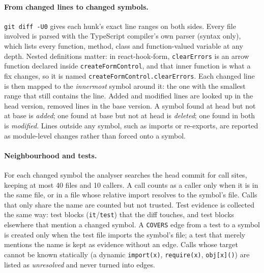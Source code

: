 \paragraph{From changed lines to changed symbols.} \texttt{git diff -U0} gives
each hunk's exact line ranges on both sides. Every file involved is parsed with
the TypeScript compiler's own parser (syntax only), which lists every function,
method, class and function-valued variable at any depth. Nested definitions
matter: in react-hook-form, \texttt{clearErrors} is an arrow function declared
inside \texttt{createFormControl}, and that inner function is what a fix
changes, so it is named \texttt{createFormControl.clearErrors}. Each changed
line is then mapped to the \emph{innermost} symbol around it: the one with the
smallest range that still contains the line. Added and modified lines are
looked up in the head version, removed lines in the base version. A symbol
found at head but not at base is \emph{added}; one found at base but not at
head is \emph{deleted}; one found in both is \emph{modified}. Lines outside any
symbol, such as imports or re-exports, are reported as module-level changes
rather than forced onto a symbol.

\paragraph{Neighbourhood and tests.} For each changed symbol the analyser
searches the head commit for call sites, keeping at most 40 files and 10
callers. A call counts as a caller only when it is in the same file, or in a
file whose relative import resolves to the symbol's file. Calls that only
share the name are counted but not trusted. Test evidence is collected the
same way: test blocks (\texttt{it}/\texttt{test}) that the diff touches, and
test blocks elsewhere that mention a changed symbol. A \texttt{COVERS} edge
from a test to a symbol is created only when the test file imports the
symbol's file; a test that merely mentions the name is kept as evidence
without an edge. Calls whose target cannot be known statically (a dynamic
\texttt{import(x)}, \texttt{require(x)}, \texttt{obj[x]()}) are listed as
\emph{unresolved} and never turned into edges.

